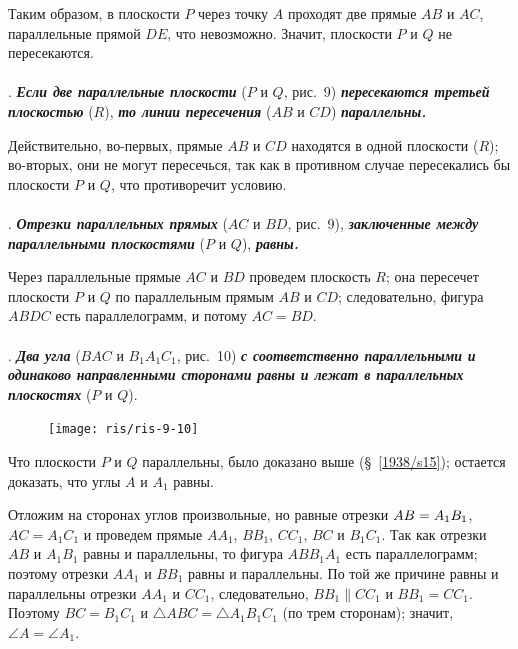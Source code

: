 \documentclass[twoside]{book}
\begin{document}
Таким образом, в плоскости $P$ через точку $A$ проходят две прямые $AB$ и $AC$, параллельные прямой $DE$, что невозможно.
Значит, плоскости $P$ и $Q$ не пересекаются.

\paragraph{}\label{1938/s16}
. \textbf{\emph{Если две параллельные плоскости}} ($P$ и $Q$, рис.~9) \textbf{\emph{пересекаются третьей плоскостью}} ($R$), \textbf{\emph{то линии пересечения}} ($AB$ и $CD$) \textbf{\emph{параллельны.}}

Действительно, во-первых, прямые $AB$ и $CD$ находятся в одной плоскости ($R$);
во-вторых, они не могут пересечься, так как в противном случае пересекались бы плоскости $P$ и $Q$, что противоречит условию.

\paragraph{}\label{1938/s17}
. \textbf{\emph{Отрезки параллельных прямых}} ($AC$ и $BD$, рис.~9), \textbf{\emph{заключенные между параллельными плоскостями}} ($P$ и $Q$), \textbf{\emph{равны.}}

Через параллельные прямые $AC$ и $BD$ проведем плоскость $R$;
она пересечет плоскости $P$ и $Q$ по параллельным прямым $AB$ и $CD$;
следовательно, фигура $ABDC$ есть параллелограмм, и потому $AC = BD$.

\paragraph{}\label{1938/s18}
. \textbf{\emph{Два угла}} ($BAC$ и $B_1A_1C_1$, рис.~10) \textbf{\emph{с соответственно параллельными и одинаково направленными сторонами равны и лежат в параллельных плоскостях}} ($P$ и $Q$).

\begin{figure}[h!]
\centering
\texttt{[image: ris/ris-9-10]}
\caption{}
\end{figure}

Что плоскости $P$ и $Q$ параллельны, было доказано выше (§~\ref{1938/s15});
остается доказать, что углы $A$ и $A_1$ равны.

Отложим на сторонах углов произвольные, но равные отрезки $AB\z=A_1B_1$, $AC=A_1C_1$ и проведем прямые $AA_1$, $BB_1$, $CC_1$, $BC$ и $B_1C_1$.
Так как отрезки $AB$ и $A_1B_1$ равны и параллельны, то фигура $ABB_1A_1$ есть параллелограмм;
поэтому отрезки $AA_1$ и $BB_1$ равны и параллельны.
По той же причине равны и параллельны отрезки $AA_1$ и $CC_1$, следовательно, $BB_1\parallel CC_1$ и $BB_1=CC_1$.
Поэтому $BC=B_1C_1$ и $\triangle ABC=\triangle A_1B_1C_1$ (по трем сторонам);
значит, $\angle A=\angle A_1$.
\end{document}
